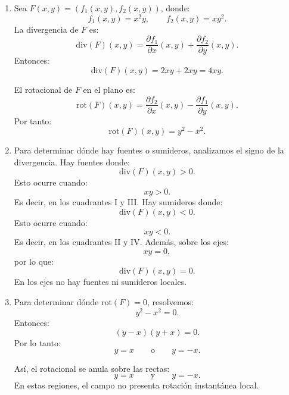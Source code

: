 \documentclass[11pt,respuestas,a4]{aleph-examen}
\begin{document}
\begin{preguntas}
\begin{respuesta}
\begin{enumerate}
    \item Sea \(F(x,y)=(f_1(x,y),f_2(x,y))\), donde:
    \[
        f_1(x,y)=x^2y,
        \qquad
        f_2(x,y)=xy^2.
    \]
    La divergencia de \(F\) es:
    \[
        \mathrm{div}(F)(x,y)
        =
        \frac{\partial f_1}{\partial x}(x,y)
        +
        \frac{\partial f_2}{\partial y}(x,y).
    \]
    Entonces:
    \[
        \mathrm{div}(F)(x,y)
        =
        2xy+2xy
        =
        4xy.
    \]

    El rotacional de \(F\) en el plano es:
    \[
        \mathrm{rot}(F)(x,y)
        =
        \frac{\partial f_2}{\partial x}(x,y)
        -
        \frac{\partial f_1}{\partial y}(x,y).
    \]
    Por tanto:
    \[
        \mathrm{rot}(F)(x,y)
        =
        y^2-x^2.
    \]

    \item Para determinar dónde hay fuentes o sumideros, analizamos el signo de la divergencia.
    Hay fuentes donde:
    \[
        \mathrm{div}(F)(x,y)>0.
    \]
    Esto ocurre cuando:
    \[
        xy>0.
    \]
    Es decir, en los cuadrantes I y III. Hay sumideros donde:
    \[
        \mathrm{div}(F)(x,y)<0.
    \]
    Esto ocurre cuando:
    \[
        xy<0.
    \]
    Es decir, en los cuadrantes II y IV. Además, sobre los ejes:
    \[
        xy=0,
    \]
    por lo que:
    \[
        \mathrm{div}(F)(x,y)=0.
    \]
    En los ejes no hay fuentes ni sumideros locales.

    \item Para determinar dónde \(\mathrm{rot}(F)=0\), resolvemos:
    \[
        y^2-x^2=0.
    \]
    Entonces:
    \[
        (y-x)(y+x)=0.
    \]
    Por lo tanto:
    \[
        y=x
        \qquad
        \text{o}
        \qquad
        y=-x.
    \]

    Así, el rotacional se anula sobre las rectas:
    \[
        y=x
        \qquad
        \text{y}
        \qquad
        y=-x.
    \]
    En estas regiones, el campo no presenta rotación instantánea local.\qedhere
\end{enumerate}
\end{respuesta}

\end{preguntas}
\end{document}
